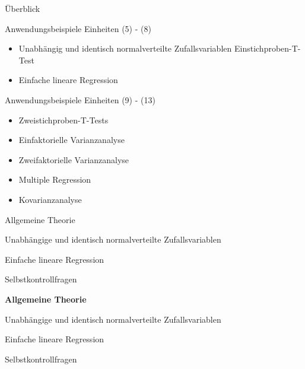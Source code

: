 \documentclass[
  8pt,
  ignorenonframetext,
]{beamer}
\providecommand{\tightlist}{%
  \setlength{\itemsep}{0pt}\setlength{\parskip}{0pt}}
\begin{document}
\begin{frame}{Überblick}
\protect\hypertarget{uxfcberblick-1}{}

Anwendungsbeispiele Einheiten (5) - (8)

\begin{itemize}
\tightlist
\item
  Unabhängig und identisch normalverteilte Zufallsvariablen \textbar{}
  Einstichproben-T-Test
\item
  Einfache lineare Regression
\end{itemize}

Anwendungsbeispiele Einheiten (9) - (13)

\begin{itemize}
\tightlist
\item
  Zweistichproben-T-Tests
\item
  Einfaktorielle Varianzanalyse
\item
  Zweifaktorielle Varianzanalyse
\item
  Multiple Regression
\item
  Kovarianzanalyse
\end{itemize}
\end{frame}

\begin{frame}{}
\protect\hypertarget{section-7}{}
\large
{}
\vfill

Allgemeine Theorie

Unabhängige und identisch normalverteilte Zufallsvariablen

Einfache lineare Regression

Selbstkontrollfragen \vfill
\end{frame}

\begin{frame}{}
\protect\hypertarget{section-8}{}
\large
{}
\vfill

\textbf{Allgemeine Theorie}

Unabhängige und identisch normalverteilte Zufallsvariablen

Einfache lineare Regression

Selbstkontrollfragen \vfill
\end{frame}
\end{document}

